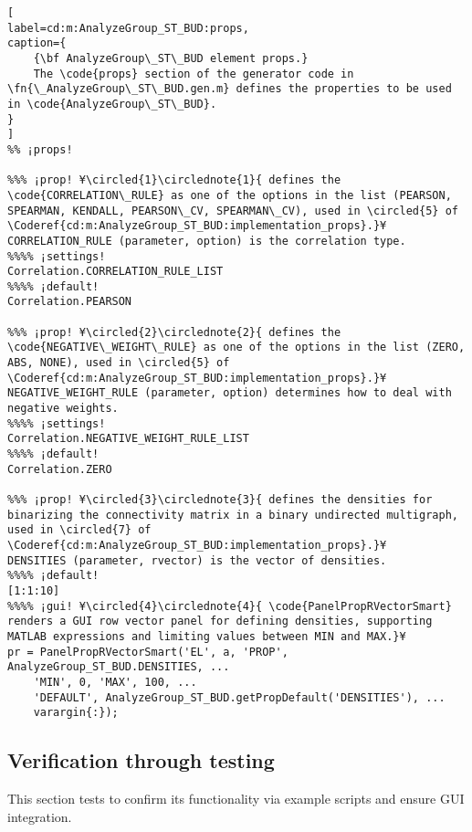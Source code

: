 \documentclass{tufte-handout}
\begin{document}
\begin{lstlisting}[
label=cd:m:AnalyzeGroup_ST_BUD:props,
caption={
	{\bf AnalyzeGroup\_ST\_BUD element props.}
	The \code{props} section of the generator code in \fn{\_AnalyzeGroup\_ST\_BUD.gen.m} defines the properties to be used in \code{AnalyzeGroup\_ST\_BUD}.
}
]
%% ¡props!

%%% ¡prop! ¥\circled{1}\circlednote{1}{ defines the \code{CORRELATION\_RULE} as one of the options in the list (PEARSON, SPEARMAN, KENDALL, PEARSON\_CV, SPEARMAN\_CV), used in \circled{5} of \Coderef{cd:m:AnalyzeGroup_ST_BUD:implementation_props}.}¥
CORRELATION_RULE (parameter, option) is the correlation type.
%%%% ¡settings!
Correlation.CORRELATION_RULE_LIST
%%%% ¡default!
Correlation.PEARSON

%%% ¡prop! ¥\circled{2}\circlednote{2}{ defines the \code{NEGATIVE\_WEIGHT\_RULE} as one of the options in the list (ZERO, ABS, NONE), used in \circled{5} of \Coderef{cd:m:AnalyzeGroup_ST_BUD:implementation_props}.}¥
NEGATIVE_WEIGHT_RULE (parameter, option) determines how to deal with negative weights.
%%%% ¡settings!
Correlation.NEGATIVE_WEIGHT_RULE_LIST
%%%% ¡default!
Correlation.ZERO

%%% ¡prop! ¥\circled{3}\circlednote{3}{ defines the densities for binarizing the connectivity matrix in a binary undirected multigraph, used in \circled{7} of \Coderef{cd:m:AnalyzeGroup_ST_BUD:implementation_props}.}¥
DENSITIES (parameter, rvector) is the vector of densities.
%%%% ¡default!
[1:1:10]
%%%% ¡gui! ¥\circled{4}\circlednote{4}{ \code{PanelPropRVectorSmart} renders a GUI row vector panel for defining densities, supporting MATLAB expressions and limiting values between MIN and MAX.}¥
pr = PanelPropRVectorSmart('EL', a, 'PROP', AnalyzeGroup_ST_BUD.DENSITIES, ...
    'MIN', 0, 'MAX', 100, ...
    'DEFAULT', AnalyzeGroup_ST_BUD.getPropDefault('DENSITIES'), ...
    varargin{:});
\end{lstlisting}

\subsection{Verification through testing}
This section tests  to confirm its functionality via example scripts and ensure GUI integration.
\end{document}
